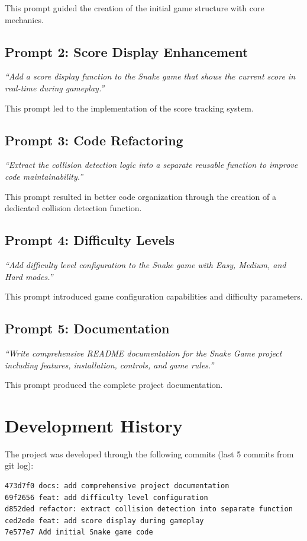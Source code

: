 \documentclass[12pt,a4paper]{article}
\begin{document}
This prompt guided the creation of the initial game structure with core mechanics.

\subsection{Prompt 2: Score Display Enhancement}
\textit{``Add a score display function to the Snake game that shows the current score in real-time during gameplay.''}

This prompt led to the implementation of the score tracking system.

\subsection{Prompt 3: Code Refactoring}
\textit{``Extract the collision detection logic into a separate reusable function to improve code maintainability.''}

This prompt resulted in better code organization through the creation of a dedicated collision detection function.

\subsection{Prompt 4: Difficulty Levels}
\textit{``Add difficulty level configuration to the Snake game with Easy, Medium, and Hard modes.''}

This prompt introduced game configuration capabilities and difficulty parameters.

\subsection{Prompt 5: Documentation}
\textit{``Write comprehensive README documentation for the Snake Game project including features, installation, controls, and game rules.''}

This prompt produced the complete project documentation.

\section{Development History}

The project was developed through the following commits (last 5 commits from git log):

\begin{verbatim}
473d7f0 docs: add comprehensive project documentation
69f2656 feat: add difficulty level configuration
d852ded refactor: extract collision detection into separate function
ced2ede feat: add score display during gameplay
7e577e7 Add initial Snake game code
\end{verbatim}
\end{document}
